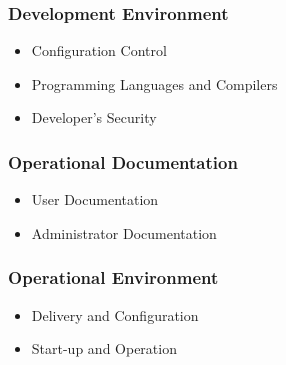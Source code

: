     \subsubsection{Development Environment}
        \begin{itemize}
            \item Configuration Control
            \item Programming Languages and Compilers
            \item Developer's Security
        \end{itemize}

    \subsubsection{Operational Documentation}
        \begin{itemize}
            \item User Documentation
            \item Administrator Documentation
        \end{itemize}

    \subsubsection{Operational Environment}
        \begin{itemize}
            \item Delivery and Configuration
            \item Start-up and Operation
        \end{itemize}

